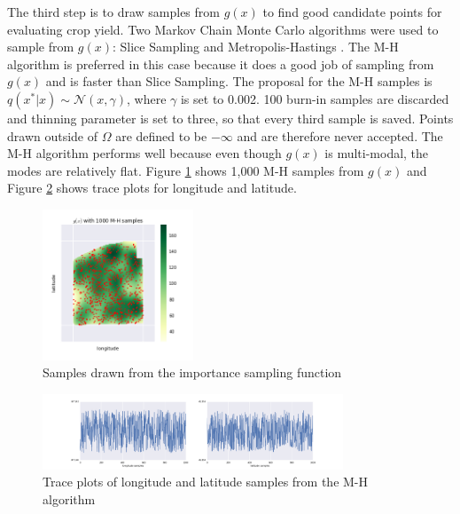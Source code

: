 \documentclass{article} %
\begin{document}

The third step is to draw samples from $g(x)$ to find good candidate points for evaluating crop yield. Two Markov Chain Monte Carlo algorithms were used to sample from $g(x)$: Slice Sampling \cite{neal} and Metropolis-Hastings \cite{chib}. The M-H algorithm is preferred in this case because it does a good job of sampling from $g(x)$ and is faster than Slice Sampling. The proposal for the M-H samples is $q(x^{*}|x) \sim \mathcal{N}(x, \gamma)$, where $\gamma$ is set to 0.002. 100 burn-in samples are discarded and thinning parameter is set to three, so that every third sample is saved. Points drawn outside of $\Omega$ are defined to be $-\infty$ and are therefore never accepted. The M-H algorithm performs well because even though $g(x)$ is multi-modal, the modes are relatively flat. Figure \ref{fig:mh} shows 1,000 M-H samples from $g(x)$ and Figure \ref{fig:trace} shows trace plots for longitude and latitude.

\begin{figure}
\begin{center}
\includegraphics[width=0.4\textwidth]{figures/gp_samples}
\caption{Samples drawn from the importance sampling function}%
\label{fig:mh}
\end{center}
\end{figure}

\begin{figure}
\begin{center}
\includegraphics[width=0.8\textwidth]{figures/trace}
\caption{Trace plots of longitude and latitude samples from the M-H algorithm}%
\label{fig:trace}
\end{center}
\end{figure}
\end{document}

